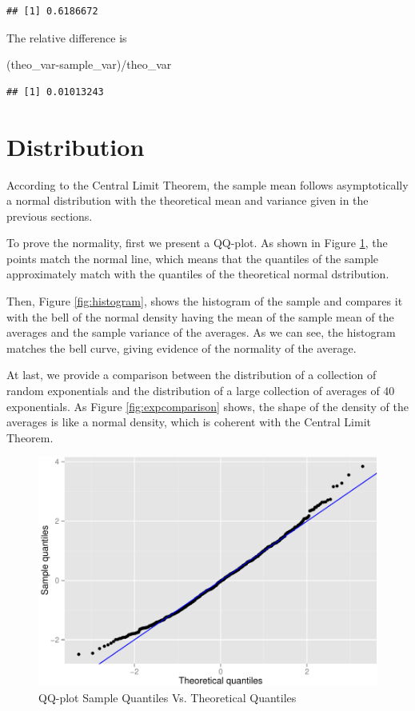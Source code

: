\documentclass[]{article}
\newenvironment{Shaded}{\begin{snugshade}}{\end{snugshade}}
\newcommand{\NormalTok}[1]{{#1}}
\begin{document}
\begin{verbatim}
## [1] 0.6186672
\end{verbatim}

The relative difference is

\begin{Shaded}
\begin{Highlighting}[]
\NormalTok{(theo_var-sample_var)/theo_var}
\end{Highlighting}
\end{Shaded}

\begin{verbatim}
## [1] 0.01013243
\end{verbatim}

\section{Distribution}

According to the Central Limit Theorem, the sample mean follows
asymptotically a normal distribution with the theoretical mean and
variance given in the previous sections.

To prove the normality, first we present a QQ-plot. As shown in Figure
\ref{fig:qqplot}, the points match the normal line, which means that the
quantiles of the sample approximately match with the quantiles of the
theoretical normal dstribution.

Then, Figure \ref{fig:histogram}, shows the histogram of the sample and
compares it with the bell of the normal density having the mean of the
sample mean of the averages and the sample variance of the averages. As
we can see, the histogram matches the bell curve, giving evidence of the
normality of the average.

At last, we provide a comparison between the distribution of a
collection of random exponentials and the distribution of a large
collection of averages of 40 exponentials. As Figure
\ref{fig:expcomparison} shows, the shape of the density of the averages
is like a normal density, which is coherent with the Central Limit
Theorem.

\begin{figure}

{\centering \includegraphics[width=.7\textwidth]{Simulation_Project_files/figure-latex/qqplot-1} 

}

\caption{QQ-plot Sample Quantiles Vs. Theoretical Quantiles}\label{fig:qqplot}
\end{figure}
\end{document}
